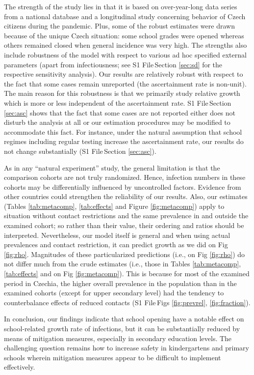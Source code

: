 \documentclass[fleqn,10pt]{wlscirep}
\def\supfile{S1 File\,}
\begin{document}
 

The strength of the study lies in that it is based on over-year-long data series from a national database and a longitudinal study concerning behavior of Czech citizens during the pandemic. Plus, some of the robust estimates were drawn because of the unique Czech situation: some school grades were opened whereas others remained closed when general incidence was very high. The strengths also include robustness of the model with respect to various ad hoc specified external parameters (apart from infectiousness; see  \supfile Section \ref{sec:sd} for the respective sensitivity analysis). Our results are relatively robust with respect to the fact that some cases remain unreported (the ascertainment rate is non-unit). The main reason for this robustness is that we primarily study relative growth which is more or less independent of the ascertainment rate. \supfile Section \ref{sec:asc} shows that the fact that some cases are not reported either does not disturb the analysis at all or our estimation procedures may be modified to accommodate this fact. For instance, under the natural assumption that school regimes including regular testing increase the ascertainment rate, our results do not change substantially (\supfile Section \ref{sec:asc}).


As in any “natural experiment” study, the general limitation is that the comparison cohorts are not truly randomized. Hence, infection numbers in these cohorts may be differentially influenced by uncontrolled factors. Evidence from other countries could strengthen the reliability of our results. Also, our estimates (Tables \ref{tab:metacomp}, \ref{tab:effects} and Figure \ref{fig:metacomp}) apply to situation without contact restrictions and the same prevalence in and outside the examined cohort; so rather than their value, their ordering and ratios should be interpreted. Nevertheless, our model itself is general and when using actual prevalences and contact restriction, it can predict growth as we did on Fig \ref{fig:rho}. Magnitudes of these particularized predictions (i.e., on Fig \ref{fig:rho}) do not differ much from the crude estimates (i.e., those in Tables \ref{tab:metacomp}, \ref{tab:effects} and on Fig \ref{fig:metacomp}). This is because for most of the examined period in Czechia, the higher overall prevalence in the population than in the examined cohorts (except for upper secondary level) had the tendency to counterbalance effects of reduced contacts (\supfile Figs  \ref{fig:prevrel}, \ref{fig:fraction}). 

In conclusion, our findings indicate that school opening have a notable effect on school-related growth rate of infections, but it can be substantially reduced by means of mitigation measures, especially in secondary education levels. The challenging question remains how to increase safety in kindergartens and primary schools wherein mitigation measures appear to be difficult to implement effectively.
\end{document}
